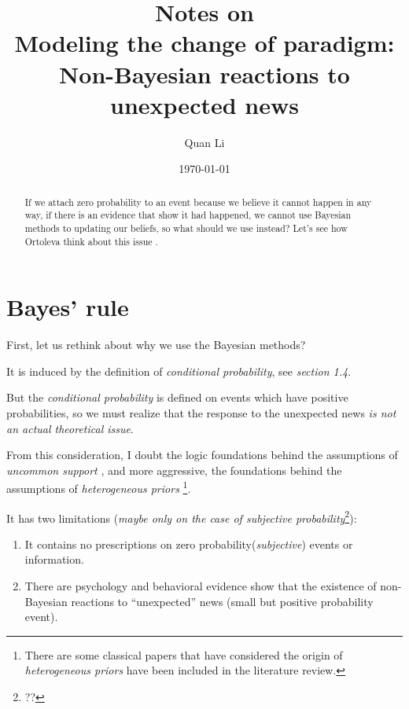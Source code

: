 \documentclass[12pt,letterpaper]{article}
\begin{document}
\title{\textbf{Notes on \citep{ortoleva2012modeling}}\\{\small \textbf{Modeling the change of paradigm: Non-Bayesian reactions to unexpected news}}}
\author{Quan Li}
\date{\today}
\maketitle

\begin{abstract}
If we attach zero probability to an event because we believe it cannot happen in any way, if there is an evidence that show it had happened, we cannot use Bayesian methods to updating our beliefs, so what should we use instead? Let's see how Ortoleva think about this issue \cite{ortoleva2012modeling}.
\end{abstract}


\section{Bayes' rule}


First, let us rethink about why we use the Bayesian methods?

It is induced by the definition of \emph{conditional probability}, see \cite{hogg2005introduction} \textit{section 1.4}.

But the \emph{conditional probability} is defined on events which have positive probabilities, so we must realize that the response to the unexpected news \emph{is not an actual theoretical issue}.

From this consideration, I doubt the logic foundations behind the assumptions of \emph{uncommon support} \citep{galperti2015hide}, and more aggressive, the foundations behind the assumptions of \emph{heterogeneous priors} \citep{alonso2016bayesian}\footnote{There are some classical papers that have considered the origin of \emph{heterogeneous priors} have been included in the literature review.}.

It has two limitations (\emph{maybe only on the case of subjective probability}\footnote{??}):

\begin{enumerate}
    \item It contains no prescriptions on zero probability(\emph{subjective}) events or information.
    \item There are psychology and behavioral evidence show that the existence of non-Bayesian reactions to “unexpected” news (small but positive probability event).
\end{enumerate}
\end{document}
